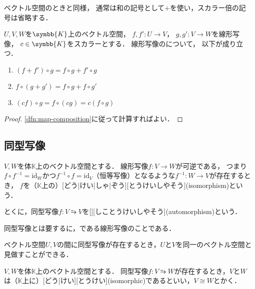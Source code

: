 \documentclass[../sotsu.tex]{subfiles}
\begin{document}
ベクトル空間のときと同様，
通常は和の記号として$+$を使い，スカラー倍の記号は省略する．



\begin{proposition}
    \label{thm:linear-map-composition}
    $U, V, W$を$\symbb{K}$上のベクトル空間，
    $f, f' \colon U \to V$，
    $g, g' \colon V \to W$を線形写像，
    $c \in \symbb{K}$をスカラーとする．
    線形写像のについて，
    以下が成り立つ．
    \begin{enumerate}
        \item $(f + f') \circ g = f \circ g + f' \circ g$
        \item $f \circ (g + g') = f \circ g + f \circ g'$
        \item $(c f) \circ g = f \circ (c g) = c (f \circ g)$
    \end{enumerate}
\end{proposition}

\begin{proof}
    \cref{dfn:map-composition}に従って計算すればよい．
\end{proof}




\subsection{同型写像}


\begin{definition}[同型写像]
    \label{dfn:isomorphism}
    $V, W$を体$𝕂$上のベクトル空間とする．
    線形写像$f \colon V \to W$が可逆である，
    つまり$f \circ f^{-1} = \mathrm{id}_W$かつ$f^{-1} \circ f = \mathrm{id}_V$（恒等写像）となるような$f^{-1} \colon W \to V$が存在するとき，
    $f$を（$𝕂$上の）[どう|けい|しゃ|ぞう][とうけいしやそう](isomorphism)という．

    とくに，同型写像$f \colon V \similarrightarrow V$を[][しことうけいしやそう](automorphism)という\cite[\S 2.1]{saito-lin-2007}．
\end{definition}

同型写像とは要するに，である線形写像のことである．

ベクトル空間$U, V$の間に同型写像が存在するとき，$U$と$V$を同一のベクトル空間と見做すことができる．

\begin{definition}[同型]
    \label{dfn:isomorphic}
    $V, W$を体$𝕂$上のベクトル空間とする．
    同型写像$f \colon V \similarrightarrow W$が存在するとき，$V$と$W$は（$𝕂$上に）[どう|けい][とうけい](isomorphic)であるといい，$V \cong W$とかく．
\end{definition}
\end{document}
